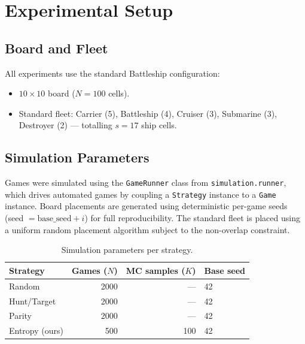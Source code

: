 \documentclass[12pt,a4paper]{article}
\newcommand{\1}{\mathbf{1}}
\begin{document}
\section{Experimental Setup}
\label{sec:experiments}

\subsection{Board and Fleet}

All experiments use the standard Battleship configuration:
\begin{itemize}[nosep]
  \item $10 \times 10$ board ($N = 100$ cells).
  \item Standard fleet: Carrier (5), Battleship (4), Cruiser (3),
        Submarine (3), Destroyer (2) — totalling $s = 17$ ship cells.
\end{itemize}

\subsection{Simulation Parameters}

Games were simulated using the \texttt{GameRunner} class from
\texttt{simulation.runner}, which drives automated games by coupling a
\texttt{Strategy} instance to a \texttt{Game} instance.  Board placements are
generated using deterministic per-game seeds (seed $= \text{base\_seed} + i$)
for full reproducibility.  The standard fleet is placed using a uniform random
placement algorithm subject to the non-overlap constraint.

\begin{table}[H]
  \centering
  \caption{Simulation parameters per strategy.}
  \label{tab:params}
  \begin{tabular}{lrrl}
    \toprule
    Strategy        & Games ($N$) & MC samples ($K$) & Base seed \\
    \midrule
    Random          & 2000        & ---              & 42 \\
    Hunt/Target     & 2000        & ---              & 42 \\
    Parity          & 2000        & ---              & 42 \\
    Entropy (ours)  & 500         & 100              & 42 \\
    \bottomrule
  \end{tabular}
\end{table}
\end{document}
